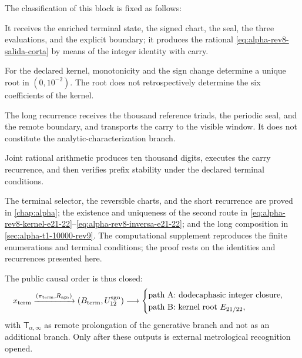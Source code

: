 The classification of this block is fixed as follows:
\begingroup
\raggedright
\begin{description}[style=nextline,leftmargin=3.2cm,labelwidth=2.8cm,labelsep=.4cm]
\item[Generative branch A: dodecaphasic closure.]
It receives the enriched terminal state, the signed chart, the seal, the three
evaluations, and the explicit boundary; it produces the rational
\eqref{eq:alpha-rev8-salida-corta} by means of the integer identity with carry.

\item[analytic-characterization branch: equation \(E_{21/22}\).]
For the declared kernel, monotonicity and the sign change determine a
unique root in \((0,10^{-2})\). The root does not retrospectively determine the
six coefficients of the kernel.

\item[Prolongation \(\mathsf T_{\alpha,\infty}\).]
The long recurrence receives the thousand reference triads, the periodic seal,
and the remote boundary, and transports the carry to the visible window. It does not
constitute the analytic-characterization branch.

\item[\(\mathcal G_9\to\mathsf T_{\alpha,\infty}\) composition.]
Joint rational arithmetic produces ten thousand digits, executes the
carry recurrence, and then verifies prefix stability under the
declared terminal conditions.
\end{description}
\endgroup

The terminal selector, the reversible charts, and the short recurrence are proved in \cref{chap:alpha}; the existence and uniqueness of the second route in \eqref{eq:alpha-rev8-kernel-e21-22}--\eqref{eq:alpha-rev8-inversa-e21-22}; and the long composition in \cref{sec:alpha-t1-10000-rev9}. The computational supplement reproduces the finite enumerations and terminal conditions; the proof rests on the identities and recurrences presented here.

The public causal order is thus closed:
\[
 x_{\rm term}
 \xrightarrow{(\pi_{\rm term},R_{\rm sgn})}
 (B_{\rm term},U_{12}^{\rm sgn})
 \longrightarrow
 \begin{cases}
 \text{path A: dodecaphasic integer closure},\\
 \text{path B: kernel root }E_{21/22},
 \end{cases}
\]
with \(\mathsf T_{\alpha,\infty}\) as remote prolongation of the generative branch and not
as an additional branch. Only
after these outputs is external metrological recognition opened.
